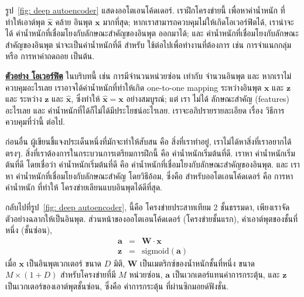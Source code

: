 รูป~\ref{fig: deep autoencoder} แสดงออโตเอนโค้ดเดอร์.
เราฝึกโครงข่ายนี้ เพื่อหาค่าน้ำหนัก ที่ทำให้เอาต์พุต $\hat{\mathbf{x}}$ คล้าย อินพุต $\mathbf{x}$ มากที่สุด;
หากเราสามารถควบคุมไม่ให้เกิดโอเวอร์ฟิตได้, เราน่าจะได้ ค่าน้ำหนักที่เชื่อมโยงกับลักษณะสำคัญของอินพุต ออกมาได้;
และ ค่าน้ำหนักที่เชื่อมโยงกับลักษณะสำคัญของอินพุต น่าจะเป็นค่าน้ำหนักที่ดี สำหรับ ใช้ต่อไปเพื่อทำงานที่ต้องการ เช่น การจำแนกกลุ่ม หรือ การหาค่าถดถอย เป็นต้น.

\begin{minipage}{5.5in}
{\small
\begin{shaded}
\underline{\textbf{ตัวอย่าง โอเวอร์ฟิต}} ในบริบทนี้ เช่น การมีจำนวนหน่วยซ่อน เท่ากับ จำนวนอินพุต และ หากเราไม่ควบคุมอะไรเลย เราอาจได้ค่าน้ำหนักที่ทำให้เกิด one-to-one mapping ระหว่างอินพุต $\mathbf{x}$ และ $\mathbf{z}$ และ ระหว่าง $\mathbf{z}$ และ $\hat{\mathbf{x}}$,
ซึ่งทำให้ $\hat{\mathbf{x}} = \mathbf{x}$ อย่างสมบูรณ์;
แต่ เรา ไม่ได้ ลักษณะสำคัญ (features) อะไรเลย และ ค่าน้ำหนักที่ได้ก็ไม่ได้มีประโยชน์อะไรเลย.
เราจะอภิปรายรายละเอียด เรื่อง วิธีการควบคุมที่ว่านี้ ต่อไป.

\end{shaded}
}%
\end{minipage}

ก่อนอื่น ผู้เขียนชี้แจงประเด็นหนึ่งที่มักจะทำให้สับสน คือ สิ่งที่เราทำอยู่, เราไม่ได้หาสิ่งที่เราอยากได้ตรงๆ.
สิ่งที่เราต้องการในกระบวนการเตรียมการฝึกนี้ คือ ค่าน้ำหนักเริ่มต้นที่ดี.
เราหา ค่าน้ำหนักเริ่มต้นที่ดี โดยเชื่อว่า ค่าน้ำหนักเริ่มต้นที่ดี คือ ค่าน้ำหนักที่เชื่อมโยงกับลักษณะสำคัญของอินพุต.
และ เราหา ค่าน้ำหนักที่เชื่อมโยงกับลักษณะสำคัญ โดยวิธีอ้อม, 
ซึ่งคือ สำหรับออโตเอนโค้ดเดอร์ คือ การหาค่าน้ำหนัก ที่ทำให้ โครงข่ายเลียนแบบอินพุตได้ดีที่สุด.

กลับไปที่รูป~\ref{fig: deep autoencoder}, นี้คือ โครงข่ายประสาทเทียม $2$ ชั้นธรรมดา, 
เพียงเราจัดตัวอย่างฉลากให้เป็นอินพุต.
ส่วนหน้าของออโตเอนโค้ดเดอร์ (โครงข่ายชั้นแรก), ค่าเอาต์พุตของชั้นที่หนึ่ง (ชั้นซ่อน),
\begin{eqnarray}
\mathbf{a} &=& \mathbf{W} \cdot \mathbf{x}
\label{eq: deep autoencoder a} \\
\mathbf{z} &=& \mathrm{sigmoid}(\mathbf{a})
\label{eq: deep autoencoder z}
\end{eqnarray}
เมื่อ $\mathbf{x}$ เป็นอินพุตเวกเตอร์ ขนาด $D$ มิติ,
$\mathbf{W}$ เป็นเมตริกซ์ของน้ำหนักชั้นที่หนึ่ง ขนาด $M \times (1+D)$ 
สำหรับโครงข่ายที่มี $M$ หน่วยซ่อน,
$\mathbf{a}$ เป็นเวกเตอร์แทนค่าการกระตุ้น,
และ $\mathbf{z}$ เป็นเวกเตอร์ของเอาต์พุตชั้นซ่อน, ซึ่งคือ ค่าการกระตุ้น ที่ผ่านซิกมอยด์ฟังชั่น.

